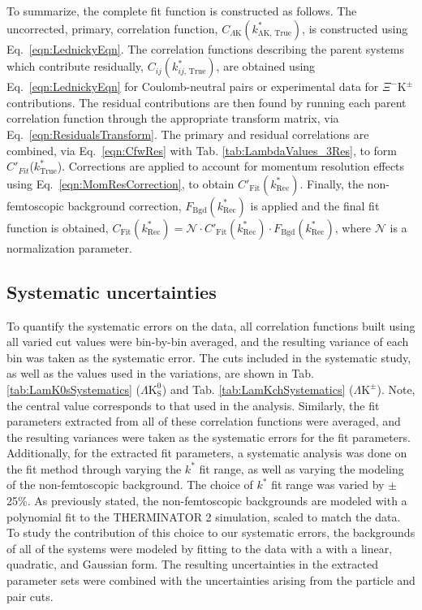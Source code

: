 \documentclass[ALICE,manyauthors]{cernphprep}
\newcommand{\kstar}{$k^{*}$\xspace}
\newcommand{\ktrue}{$k^{*}_{\mathrm{True}}$\xspace}
\newcommand{\LamKpm}{$\Lambda\mathrm{K^{\pm}}$\xspace}
\newcommand{\LamKs}{$\Lambda\mathrm{K^{0}_{S}}$\xspace}
\newcommand{\XiKpm}{$\Xi^{-}\mathrm{K^{\pm}}$\xspace}
\begin{document}
To summarize, the complete fit function is constructed as follows.
The uncorrected, primary, correlation function, $C_{\Lambda\mathrm{K}}(k^{*}_{\mathrm{\Lambda K,\,True}})$, is constructed using Eq.\ \ref{eqn:LednickyEqn}.
The correlation functions describing the parent systems which contribute residually, $C_{ij}(k^{*}_{ij,\,\mathrm{True}})$, are obtained using Eq.\ \ref{eqn:LednickyEqn} for Coulomb-neutral pairs or experimental data for \XiKpm contributions.
The residual contributions are then found by running each parent correlation function through the appropriate transform matrix, via Eq.\ \ref{eqn:ResidualsTransform}.
The primary and residual correlations are combined, via Eq.\ \ref{eqn:CfwRes} with Tab. \ref{tab:LambdaValues_3Res}, to form $C'_{Fit}$(\ktrue).
Corrections are applied to account for momentum resolution effects using Eq.\ \ref{eqn:MomResCorrection}, to obtain $C'_{\mathrm{Fit}}(k^{*}_{\mathrm{Rec}})$.
Finally, the non-femtoscopic background correction, $F_{\mathrm{Bgd}}(k^{*}_{\mathrm{Rec}})$ is applied and the final fit function is obtained, $C_{\mathrm{Fit}}(k^{*}_{\mathrm{Rec}}) = \mathcal{N}\cdot C'_{\mathrm{Fit}}(k^{*}_{\mathrm{Rec}})\cdot F_{\mathrm{Bgd}}(k^{*}_{\mathrm{Rec}})$, where $\mathcal{N}$ is a normalization parameter.

\subsection{Systematic uncertainties}
\label{SysErrs}

To quantify the systematic errors on the data, all correlation functions built using all varied cut values were bin-by-bin averaged, and the resulting variance of each bin was taken as the systematic error.  
The cuts included in the systematic study, as well as the values used in the variations, are shown in Tab. \ref{tab:LamK0sSystematics} (\LamKs) and Tab. \ref{tab:LamKchSystematics} (\LamKpm).  
Note, the central value corresponds to that used in the analysis.
Similarly, the fit parameters extracted from all of these correlation functions were averaged, and the resulting variances were taken as the systematic errors for the fit parameters.
Additionally, for the extracted fit parameters, a systematic analysis was done on the fit method through varying the \kstar fit range, as well as varying the modeling of the non-femtoscopic background.
The choice of \kstar fit range was varied by $\pm$ 25\%. 
As previously stated, the non-femtoscopic backgrounds are modeled with a polynomial fit to the THERMINATOR 2 simulation, scaled to match the data.
To study the contribution of this choice to our systematic errors, the backgrounds of all of the systems were modeled by fitting to the data with a with a linear, quadratic, and Gaussian form.
The resulting uncertainties in the extracted parameter sets were combined with the uncertainties arising from the particle and pair cuts.
\end{document}
